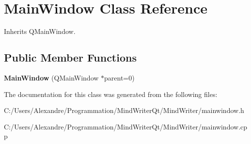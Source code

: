 \hypertarget{class_main_window}{\section{Main\-Window Class Reference}
\label{class_main_window}
}


Inherits Q\-Main\-Window.

\subsection*{Public Member Functions}
\begin{DoxyCompactItemize}
\item 
\hypertarget{class_main_window_ab7d94977fe4f15c9850f3e4928e02672}{{\bfseries Main\-Window} (Q\-Main\-Window $\ast$parent=0)}\label{class_main_window_ab7d94977fe4f15c9850f3e4928e02672}

\end{DoxyCompactItemize}


The documentation for this class was generated from the following files\-:\begin{DoxyCompactItemize}
\item 
C\-:/\-Users/\-Alexandre/\-Programmation/\-Mind\-Writer\-Qt/\-Mind\-Writer/mainwindow.\-h\item 
C\-:/\-Users/\-Alexandre/\-Programmation/\-Mind\-Writer\-Qt/\-Mind\-Writer/mainwindow.\-cpp\end{DoxyCompactItemize}
